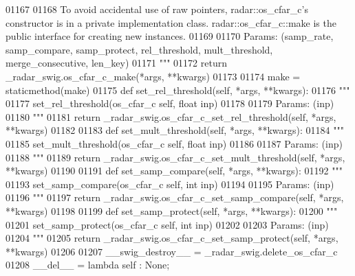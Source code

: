 \begin{DoxyCode}
{{{{{{01167 \textcolor{stringliteral}{}
01168 \textcolor{stringliteral}{        To avoid accidental use of raw pointers, radar::os\_cfar\_c's constructor is in a private
       implementation class. radar::os\_cfar\_c::make is the public interface for creating new instances.}
01169 \textcolor{stringliteral}{}
01170 \textcolor{stringliteral}{        Params: (samp\_rate, samp\_compare, samp\_protect, rel\_threshold, mult\_threshold, merge\_consecutive,
       len\_key)}
01171 \textcolor{stringliteral}{        """}
01172         \textcolor{keywordflow}{return} \_radar\_swig.os\_cfar\_c\_make(*args, **kwargs)
01173 
01174     make = staticmethod(make)
01175     \textcolor{keyword}{def }set_rel_threshold(self, *args, **kwargs):
01176         \textcolor{stringliteral}{"""}
01177 \textcolor{stringliteral}{        set\_rel\_threshold(os\_cfar\_c self, float inp)}
01178 \textcolor{stringliteral}{}
01179 \textcolor{stringliteral}{        Params: (inp)}
01180 \textcolor{stringliteral}{        """}
01181         \textcolor{keywordflow}{return} \_radar\_swig.os\_cfar\_c\_set\_rel\_threshold(self, *args, **kwargs)
01182 
01183     \textcolor{keyword}{def }set_mult_threshold(self, *args, **kwargs):
01184         \textcolor{stringliteral}{"""}
01185 \textcolor{stringliteral}{        set\_mult\_threshold(os\_cfar\_c self, float inp)}
01186 \textcolor{stringliteral}{}
01187 \textcolor{stringliteral}{        Params: (inp)}
01188 \textcolor{stringliteral}{        """}
01189         \textcolor{keywordflow}{return} \_radar\_swig.os\_cfar\_c\_set\_mult\_threshold(self, *args, **kwargs)
01190 
01191     \textcolor{keyword}{def }set_samp_compare(self, *args, **kwargs):
01192         \textcolor{stringliteral}{"""}
01193 \textcolor{stringliteral}{        set\_samp\_compare(os\_cfar\_c self, int inp)}
01194 \textcolor{stringliteral}{}
01195 \textcolor{stringliteral}{        Params: (inp)}
01196 \textcolor{stringliteral}{        """}
01197         \textcolor{keywordflow}{return} \_radar\_swig.os\_cfar\_c\_set\_samp\_compare(self, *args, **kwargs)
01198 
01199     \textcolor{keyword}{def }set_samp_protect(self, *args, **kwargs):
01200         \textcolor{stringliteral}{"""}
01201 \textcolor{stringliteral}{        set\_samp\_protect(os\_cfar\_c self, int inp)}
01202 \textcolor{stringliteral}{}
01203 \textcolor{stringliteral}{        Params: (inp)}
01204 \textcolor{stringliteral}{        """}
01205         \textcolor{keywordflow}{return} \_radar\_swig.os\_cfar\_c\_set\_samp\_protect(self, *args, **kwargs)
01206 
01207     \_\_swig\_destroy\_\_ = \_radar\_swig.delete\_os\_cfar\_c
01208     \_\_del\_\_ = \textcolor{keyword}{lambda} self : \textcolor{keywordtype}{None};
}}}}}}
\end{DoxyCode}
